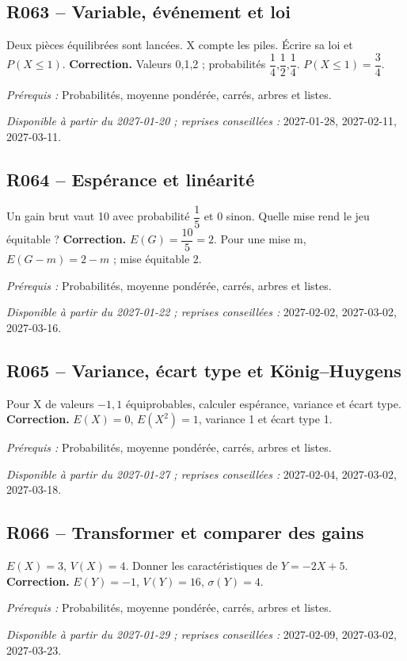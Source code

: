 \subsection*{R063 -- Variable, événement et loi}\label{R063}
Deux pièces équilibrées sont lancées. X compte les piles. Écrire sa loi et $P(X\leq1)$.
\ifprof\textbf{Correction.} Valeurs 0,1,2 ; probabilités $\dfrac{1}{4}$,$\dfrac{1}{2}$,$\dfrac{1}{4}$. $P(X\leq1)=\dfrac{3}{4}$.\par\textit{Prérequis :} Probabilités, moyenne pondérée, carrés, arbres et listes.\par\textit{Disponible à partir du 2027-01-20 ; reprises conseillées :} 2027-01-28, 2027-02-11, 2027-03-11.\fi
{}\subsection*{R064 -- Espérance et linéarité}\label{R064}
Un gain brut vaut 10 avec probabilité $\dfrac{1}{5}$ et 0 sinon. Quelle mise rend le jeu équitable ?
\ifprof\textbf{Correction.} $E(G)=\dfrac{10}{5}=2$. Pour une mise m, $E(G-m)=2-m$ ; mise équitable 2.\par\textit{Prérequis :} Probabilités, moyenne pondérée, carrés, arbres et listes.\par\textit{Disponible à partir du 2027-01-22 ; reprises conseillées :} 2027-02-02, 2027-03-02, 2027-03-16.\fi
{}\subsection*{R065 -- Variance, écart type et König–Huygens}\label{R065}
Pour X de valeurs $-1,1$ équiprobables, calculer espérance, variance et écart type.
\ifprof\textbf{Correction.} $E(X)=0$, $E(X^2)=1$, variance 1 et écart type 1.\par\textit{Prérequis :} Probabilités, moyenne pondérée, carrés, arbres et listes.\par\textit{Disponible à partir du 2027-01-27 ; reprises conseillées :} 2027-02-04, 2027-03-02, 2027-03-18.\fi
{}\subsection*{R066 -- Transformer et comparer des gains}\label{R066}
$E(X)=3$, $V(X)=4$. Donner les caractéristiques de $Y=-2X+5$.
\ifprof\textbf{Correction.} $E(Y)=-1$, $V(Y)=16$, $\sigma(Y)=4$.\par\textit{Prérequis :} Probabilités, moyenne pondérée, carrés, arbres et listes.\par\textit{Disponible à partir du 2027-01-29 ; reprises conseillées :} 2027-02-09, 2027-03-02, 2027-03-23.\fi
